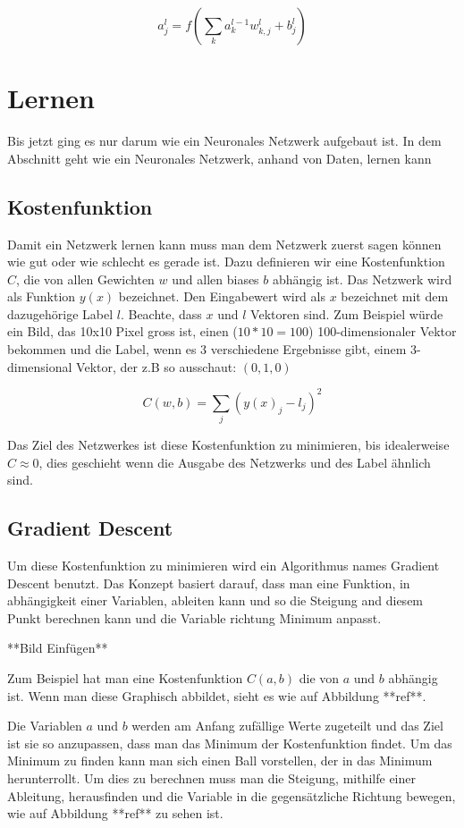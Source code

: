 \documentclass[12pt,a4paper]{report}
\begin{document}
\[a^l_j = f\left(\sum_{k} a^{l-1}_k w^l_{k,j} + b^l_j\right)\]

\section{Lernen}\label{sec:lernen}
Bis jetzt ging es nur darum wie ein Neuronales Netzwerk aufgebaut ist.
In dem Abschnitt geht wie ein Neuronales Netzwerk, anhand von Daten, lernen kann
\subsection{Kostenfunktion}
Damit ein Netzwerk lernen kann muss man dem Netzwerk zuerst sagen können wie gut oder wie schlecht es gerade ist.
Dazu definieren wir eine Kostenfunktion $C$, die von allen Gewichten $w$ und allen biases $b$ abhängig ist.
Das Netzwerk wird als Funktion $y(x)$ bezeichnet.
Den Eingabewert wird als $x$ bezeichnet mit dem dazugehörige Label $l$.
Beachte, dass $x$ und $l$ Vektoren sind.
Zum Beispiel würde ein Bild, das 10x10 Pixel gross ist, einen ($10 * 10 = 100$) 100-dimensionaler Vektor bekommen
und die Label, wenn es 3 verschiedene Ergebnisse gibt, einem 3-dimensional Vektor, der z.B so ausschaut: $(0, 1, 0)$

\[C(w,b) = \sum_{j}(y(x)_j - l_j)^2\]

Das Ziel des Netzwerkes ist diese Kostenfunktion zu minimieren, bis idealerweise $C \approx 0$,
dies geschieht wenn die Ausgabe des Netzwerks und des Label ähnlich sind.
\subsection{Gradient Descent}
Um diese Kostenfunktion zu minimieren wird ein Algorithmus names Gradient Descent benutzt.
Das Konzept basiert darauf, dass man eine Funktion, in abhängigkeit einer Variablen, ableiten kann und so die Steigung
and diesem Punkt berechnen kann und die Variable richtung Minimum anpasst.

**Bild Einfügen**

Zum Beispiel hat man eine Kostenfunktion $C(a,b)$ die von $a$ und $b$ abhängig ist.
Wenn man diese Graphisch abbildet, sieht es wie auf Abbildung **ref**.

Die Variablen $a$ und $b$ werden am Anfang zufällige Werte zugeteilt und das Ziel ist sie so anzupassen,
dass man das Minimum der Kostenfunktion findet.
Um das Minimum zu finden kann man sich einen Ball vorstellen, der in das Minimum herunterrollt.
Um dies zu berechnen muss man die Steigung, mithilfe einer Ableitung, herausfinden und die Variable in die
gegensätzliche Richtung bewegen, wie auf Abbildung **ref** zu sehen ist.
\end{document}
